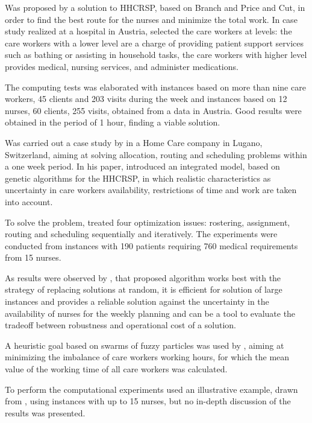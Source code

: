 Was proposed by  a solution to \ac{HHCRSP}, based on Branch and Price and Cut, in order to find the best route for the nurses and minimize the total work.
In case study realized at a hospital in Austria,  selected the care workers at levels: the care workers with a lower level are a charge of providing patient support services such as bathing or assisting in household tasks, the care workers with higher level provides medical, nursing services, and administer medications.

The computing tests  was elaborated with instances based on more than nine care workers, 45 clients and 203 visits during the week and instances based on 12 nurses, 60 clients, 255 visits, obtained from a data in Austria. Good results were obtained in the period of 1 hour, finding a viable solution.


Was carried out a case study by  in a Home Care company in Lugano, Switzerland, aiming at solving allocation, routing and scheduling problems within a one week period.
In his paper,  introduced an integrated model, based on genetic algorithms for the \ac{HHCRSP}, in which realistic characteristics as uncertainty in care workers availability, restrictions of time and work are taken into account.

To solve the problem,  treated four optimization issues: rostering, assignment, routing and scheduling sequentially and iteratively.
The experiments were conducted from instances with 190 patients requiring 760 medical requirements from 15 nurses.

As results were observed by , that proposed algorithm works best with the strategy of replacing solutions at random, it is efficient for solution of large instances and provides a reliable solution against the uncertainty in the availability of nurses for the weekly planning and can be a tool to evaluate the tradeoff between robustness and  operational cost of a solution.

A heuristic goal based on swarms of fuzzy particles was used by , aiming at minimizing the imbalance of care workers working hours, for which the mean value of the working time of all care workers was calculated.

To perform the computational experiments  used an illustrative example, drawn from , using instances with up to 15 nurses, but no in-depth discussion of the results was presented.

